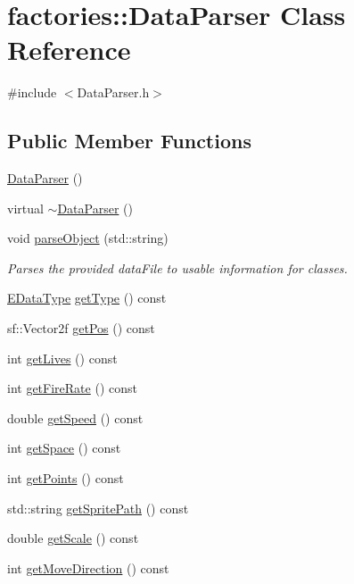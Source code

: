 \hypertarget{classfactories_1_1DataParser}{\section{factories\-:\-:\-Data\-Parser \-Class \-Reference}
\label{d0/df8/classfactories_1_1DataParser}
}


{\ttfamily \#include $<$\-Data\-Parser.\-h$>$}

\subsection*{\-Public \-Member \-Functions}
\begin{DoxyCompactItemize}
\item 
\hyperlink{classfactories_1_1DataParser_aac17dc8db51596aca733fa922e1a63b9}{\-Data\-Parser} ()
\item 
virtual \hyperlink{classfactories_1_1DataParser_ada5bd61bf142b53c761b651dbbb300e6}{$\sim$\-Data\-Parser} ()
\item 
void \hyperlink{classfactories_1_1DataParser_ac46afc028909e2879ccc6049396371b5}{parse\-Object} (std\-::string)
\begin{DoxyCompactList}\small\item\em \-Parses the provided data\-File to usable information for classes. \end{DoxyCompactList}\item 
\hyperlink{namespacefactories_ab925b318a5bc89d3bc8a7e3fdc364023}{\-E\-Data\-Type} \hyperlink{classfactories_1_1DataParser_aef51f61d8415bd0ca5645a85a7698412}{get\-Type} () const 
\item 
sf\-::\-Vector2f \hyperlink{classfactories_1_1DataParser_a3e0e635185cfd30d7580da30fd3fae71}{get\-Pos} () const 
\item 
int \hyperlink{classfactories_1_1DataParser_adedcdaf3f1eda6b1d4ed078c11d71b1e}{get\-Lives} () const 
\item 
int \hyperlink{classfactories_1_1DataParser_a55ad897d093a9076f97756adad963081}{get\-Fire\-Rate} () const 
\item 
double \hyperlink{classfactories_1_1DataParser_abdd71ea54b23d6fb94561300d72a1fa2}{get\-Speed} () const 
\item 
int \hyperlink{classfactories_1_1DataParser_a62a533de7d1b80a486c5e99271b3a9d9}{get\-Space} () const 
\item 
int \hyperlink{classfactories_1_1DataParser_afcd3558ab77010523582314345574b37}{get\-Points} () const 
\item 
std\-::string \hyperlink{classfactories_1_1DataParser_af75268ebfca8319cfdf33f1532e20c01}{get\-Sprite\-Path} () const 
\item 
double \hyperlink{classfactories_1_1DataParser_a9c9e6de122e3ccd430c13d2012fb19e2}{get\-Scale} () const 
\item 
int \hyperlink{classfactories_1_1DataParser_a6dacf31e0201c6e4deda4e416bcc1429}{get\-Move\-Direction} () const 
\end{DoxyCompactItemize}
